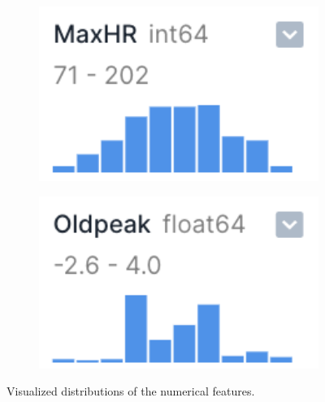 \begin{figure}[H]
\begin{subfigure}{0.19\columnwidth}
    \end{subfigure}
    \begin{subfigure}{0.19\columnwidth}
        \includegraphics[width=1\textwidth]{images/feat_maxhr.png}
    \end{subfigure}
    \begin{subfigure}{0.19\columnwidth}
        \includegraphics[width=1\textwidth]{images/feat_oldpeak.png}
    \end{subfigure}
    \caption{Visualized distributions of the numerical features.}
\end{figure}

